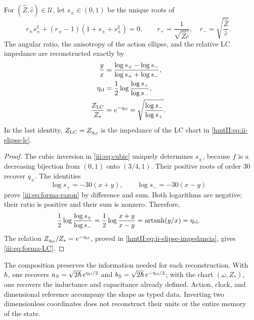 \begin{proposition}
\label{iii:prop:forma-LC}
For $(\widehat Z,\widehat c)\in\mathcal U$, let $s_\pm\in(0,1)$ be the
unique roots of
\begin{equation}
 r_\pm s_\pm^3+(r_\pm-1)(1+s_\pm+s_\pm^2)=0,
 \qquad
 r_+=\frac1{\sqrt{\widehat Z\widehat c}},\quad
 r_-=\sqrt{\frac{\widehat Z}{\widehat c}}.
 \label{iii:eq:forma-inversion}
\end{equation}
The angular ratio, the anisotropy of the action ellipse, and the relative LC
impedance are reconstructed exactly by
\begin{align}
 \frac{y}{x}
 &=\frac{\log s_+-\log s_-}{\log s_++\log s_-},
 \label{iii:eq:forma-razon}\\
 \eta_{\rm el}
 &=\frac12\log\frac{\log s_+}{\log s_-},
 \label{iii:eq:forma-eta}\\
 \frac{Z_{\rm LC}}{Z_*}
 &=e^{-\eta_{\rm el}}
  =\sqrt{\frac{\log s_-}{\log s_+}}.
 \label{iii:eq:forma-LC}
\end{align}
In the last identity, $Z_{\rm LC}=Z_{\eta_{\rm el}}$ is the impedance
of the LC chart in \eqref{hmtII:eq:ii-elipse-lc}.
\end{proposition}
\begin{proof}
The cubic inversion in \eqref{iii:eq:cubic} uniquely determines $s_\pm$,
because $f$ is a decreasing bijection from $(0,1)$ onto
$(3/4,1)$. Their positive roots of order $30$ recover $q_\pm$.
The identities
\[
 \log s_+=-30(x+y),\qquad \log s_-=-30(x-y)
\]
prove \eqref{iii:eq:forma-razon} by difference and sum. Both logarithms
are negative; their ratio is positive and their sum is nonzero. Therefore,
\[
 \frac12\log\frac{\log s_+}{\log s_-}
   =\frac12\log\frac{x+y}{x-y}
   =\operatorname{artanh}(y/x)=\eta_{\rm el}.
\]
The relation $Z_{\eta_{\rm el}}/Z_*=e^{-\eta_{\rm el}}$, proved in
\eqref{hmtII:eq:ii-elipse-impedancia}, gives \eqref{iii:eq:forma-LC}.
\end{proof}

The composition preserves the information needed for each reconstruction.
With $\hbar$, one recovers
$a_S=\sqrt{2\hbar}\,e^{\eta_{\rm el}/2}$ and
$b_S=\sqrt{2\hbar}\,e^{-\eta_{\rm el}/2}$; with the chart
$(\omega,Z_*)$, one recovers the inductance and capacitance already defined.
Action, clock, and dimensional reference accompany the shape as
typed data. Inverting two dimensionless coordinates does not
reconstruct their units or the entire memory of the state.

